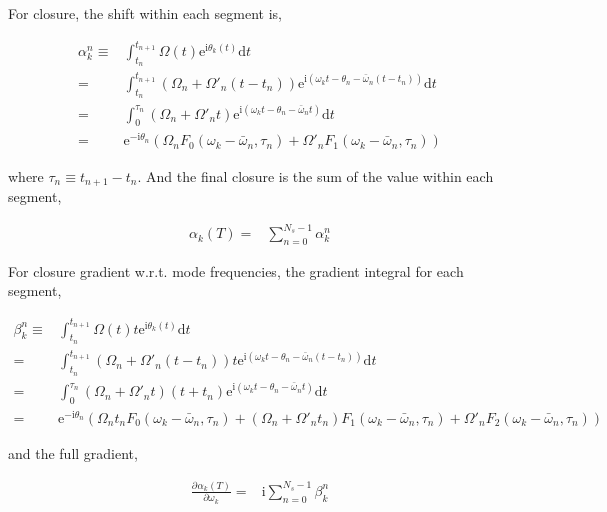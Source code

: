 \documentclass[10pt,fleqn]{article}
\newcommand{\ud}{\mathrm{d}}
\newcommand{\ue}{\mathrm{e}}
\newcommand{\ui}{\mathrm{i}}
\newcommand{\eqar}[1]
{
  \begin{align*}
    #1
  \end{align*}
}
\newcommand{\paren}[1]{{\left({#1}\right)}}
\newcommand{\pdiff}[3][{}]{{\frac{\partial^{#1} {#2}}{\partial {#3}{}^{#1}}}}
\begin{document}
For closure, the shift within each segment is,
\eqar{
  \alpha_k^n\equiv&\int_{t_n}^{t_{n+1}}\Omega(t)\ue^{\ui\theta_k(t)}\ud t\\
  =&\int_{t_n}^{t_{n+1}}\paren{\Omega_n+\Omega'_n\paren{t-t_n}}\ue^{\ui\paren{\omega_kt-\theta_n-\bar\omega_n\paren{t-t_n}}}\ud t\\
  =&\int_{0}^{\tau_n}\paren{\Omega_n+\Omega'_n t}\ue^{\ui\paren{\omega_kt-\theta_n-\bar\omega_n t}}\ud t\\
  =&\ue^{-\ui\theta_n}\paren{\Omega_nF_0(\omega_k-\bar\omega_n, \tau_n)+\Omega'_nF_1(\omega_k-\bar\omega_n, \tau_n)}
}
where $\tau_n\equiv t_{n+1}-t_n$. And the final closure is the sum of the value within each segment,
\eqar{
  \alpha_k(T)=&\sum_{n=0}^{N_s-1}\alpha_k^n
}

For closure gradient w.r.t. mode frequencies, the gradient integral for each segment,
\eqar{
  \beta_k^n\equiv&\int_{t_n}^{t_{n+1}}\Omega(t)t\ue^{\ui\theta_k(t)}\ud t\\
  =&\int_{t_n}^{t_{n+1}}\paren{\Omega_n+\Omega'_n\paren{t-t_n}}t\ue^{\ui\paren{\omega_kt-\theta_n-\bar\omega_n\paren{t-t_n}}}\ud t\\
  =&\int_{0}^{\tau_n}\paren{\Omega_n+\Omega'_n t}\paren{t+t_n}\ue^{\ui\paren{\omega_kt-\theta_n-\bar\omega_n t}}\ud t\\
  =&\ue^{-\ui\theta_n}\paren{\Omega_nt_nF_0(\omega_k-\bar\omega_n, \tau_n)+\paren{\Omega_n+\Omega'_nt_n}F_1(\omega_k-\bar\omega_n, \tau_n)+\Omega'_nF_2(\omega_k-\bar\omega_n, \tau_n)}
}
and the full gradient,
\eqar{
  \pdiff{\alpha_k(T)}{\omega_k}=&\ui\sum_{n=0}^{N_s-1}\beta_k^n
}
\end{document}
